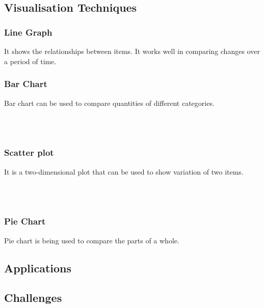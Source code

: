  
 
 \\\
 

 
 
 \subsection{Visualisation Techniques}
 
 \subsubsection{Line Graph}
 
 It shows the relationships between items. It works well in comparing changes over a period of time.
 
 \subsubsection{Bar Chart}
 
 Bar chart can be used to compare quantities of different categories.
 
 \\\
 
 \subsubsection{Scatter plot}
 
 It is a two-dimensional plot that can be used to show variation of two items.
 
 \\\
 
 \subsubsection{Pie Chart}
 
 Pie chart is being used to compare the parts of a whole.
 
 \subsection{Applications}
 
 \subsection{Challenges}